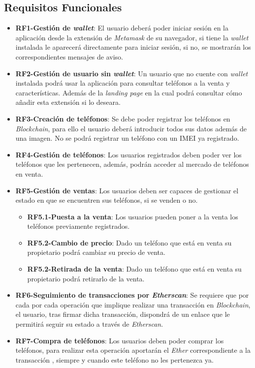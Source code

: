 \subsection{Requisitos Funcionales}
\begin{itemize}
    \item \textbf{RF1-Gestión de \textit{wallet}}: El usuario deberá poder iniciar sesión en la aplicación desde la extensión de \textit{Metamask} de su navegador, si tiene la \textit{wallet} instalada le aparecerá directamente para iniciar sesión, si no, se mostrarán los correspondientes mensajes de aviso.
    \item \textbf{RF2-Gestión de usuario sin \textit{wallet}}: Un usuario que no cuente con \textit{wallet} instalada podrá usar la aplicación para consultar teléfonos a la venta y características. Además de la \textit{landing page} en la cual podrá consultar cómo añadir esta extensión si lo deseara.
    \item \textbf{RF3-Creación de teléfonos}: Se debe poder registrar los teléfonos en \textit{Blockchain}, para ello el usuario deberá introducir todos sus datos además de una imagen. No se podrá registrar un teléfono con un IMEI ya registrado.
    \item \textbf{RF4-Gestión de teléfonos}: Los usuarios registrados deben poder ver los teléfonos que les pertenecen, además, podrán acceder al mercado de teléfonos en venta.
    \item \textbf{RF5-Gestión de ventas}: Los usuarios deben ser capaces de gestionar el estado en que se encuentren sus teléfonos, si se venden o no.
    \begin{itemize}
        \item \textbf{RF5.1-Puesta a la venta}: Los usuarios pueden poner a la venta los teléfonos previamente registrados.
        \item \textbf{RF5.2-Cambio de precio}: Dado un teléfono que está en venta su propietario podrá cambiar su precio de venta.
        \item \textbf{RF5.2-Retirada de la venta}: Dado un teléfono que está en venta su propietario podrá retirarlo de la venta.
    \end{itemize}
    \item \textbf{RF6-\textbf{Seguimiento de transacciones por \textit{Etherscan}}}: Se requiere que por cada por cada operación que implique realizar una transacción en \textit{Blockchain}, el usuario, tras firmar dicha transacción, dispondrá de un enlace que le permitirá seguir su estado a través de \textit{Etherscan}.
    \item \textbf{RF7-Compra de teléfonos}: Los usuarios deben poder comprar los teléfonos, para realizar esta operación aportarán el \textit{Ether} correspondiente a la transacción , siempre y cuando este teléfono no les pertenezca ya.
\end{itemize}

